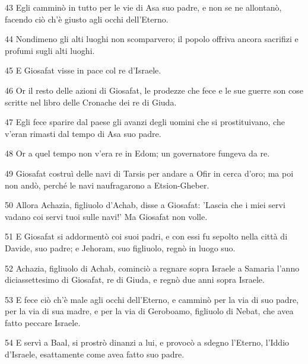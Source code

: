 \par 43 Egli camminò in tutto per le vie di Asa suo padre, e non se ne allontanò, facendo ciò ch'è giusto agli occhi dell'Eterno.
\par 44 Nondimeno gli alti luoghi non scomparvero; il popolo offriva ancora sacrifizi e profumi sugli alti luoghi.
\par 45 E Giosafat visse in pace col re d'Israele.
\par 46 Or il resto delle azioni di Giosafat, le prodezze che fece e le sue guerre son cose scritte nel libro delle Cronache dei re di Giuda.
\par 47 Egli fece sparire dal paese gli avanzi degli uomini che si prostituivano, che v'eran rimasti dal tempo di Asa suo padre.
\par 48 Or a quel tempo non v'era re in Edom; un governatore fungeva da re.
\par 49 Giosafat costruì delle navi di Tarsis per andare a Ofir in cerca d'oro; ma poi non andò, perché le navi naufragarono a Etsion-Gheber.
\par 50 Allora Achazia, figliuolo d'Achab, disse a Giosafat: 'Lascia che i miei servi vadano coi servi tuoi sulle navi!' Ma Giosafat non volle.
\par 51 E Giosafat si addormentò coi suoi padri, e con essi fu sepolto nella città di Davide, suo padre; e Jehoram, suo figliuolo, regnò in luogo suo.
\par 52 Achazia, figliuolo di Achab, cominciò a regnare sopra Israele a Samaria l'anno diciassettesimo di Giosafat, re di Giuda, e regnò due anni sopra Israele.
\par 53 E fece ciò ch'è male agli occhi dell'Eterno, e camminò per la via di suo padre, per la via di sua madre, e per la via di Geroboamo, figliuolo di Nebat, che avea fatto peccare Israele.
\par 54 E servì a Baal, si prostrò dinanzi a lui, e provocò a sdegno l'Eterno, l'Iddio d'Israele, esattamente come avea fatto suo padre.


